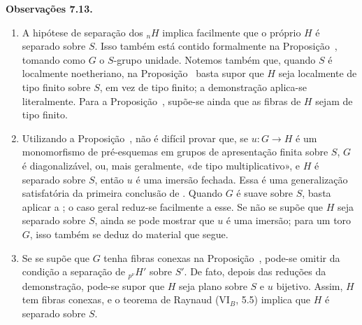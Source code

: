 \medskip
\noindent{}\textbf{Observações 7.13.}
\begin{enumerate}
  \item[(a)] A hipótese de separação dos \({}_nH\) implica facilmente
  que o próprio \(H\) é separado sobre \(S\). Isso também está contido
  formalmente na Proposição~,
  tomando como \(G\) o \(S\)-grupo unidade. Notemos também que, quando
  \(S\) é localmente noetheriano, na Proposição~
  basta supor que \(H\) seja localmente de tipo finito sobre \(S\), em vez
  de tipo finito; a demonstração aplica-se literalmente. Para a
  Proposição~, supõe-se
  ainda que as fibras de \(H\) sejam de tipo finito.

  \item[(b)] Utilizando a
  Proposição~, não é difícil
  provar que, se \(u:G\to H\) é um monomorfismo de pré-esquemas em grupos
  de apresentação finita sobre \(S\), \(G\) é diagonalizável, ou, mais
  geralmente, «de tipo multiplicativo», e \(H\) é separado sobre \(S\),
  então \(u\) é uma imersão fechada. Essa é uma generalização
  satisfatória da primeira conclusão de
  . Quando \(G\) é suave sobre \(S\),
  basta aplicar a
  ; o caso geral
  reduz-se facilmente a esse. Se não se supõe que \(H\) seja separado
  sobre \(S\), ainda se pode mostrar que \(u\) é uma imersão; para um
  toro \(G\), isso também se deduz do material que segue.

  \item[(c)] Se se supõe que \(G\) tenha fibras conexas na
  Proposição~, pode-se omitir
  da condição  a
  separação de \({}_{p^\nu}H'\) sobre \(S'\). De fato, depois das
  reduções da demonstração, pode-se supor que \(H\) seja plano sobre
  \(S\) e \(u\) bijetivo. Assim, \(H\) tem fibras conexas, e o teorema de
  Raynaud (VI\(_B\), 5.5) implica que \(H\) é separado sobre
  \(S\).
\end{enumerate}

